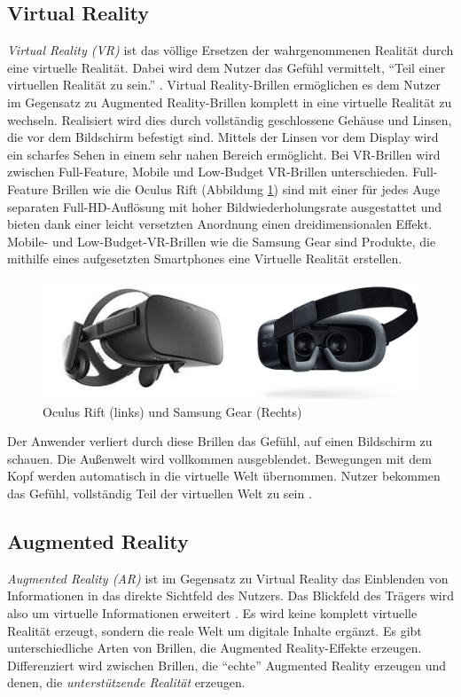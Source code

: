 \subsection{Virtual Reality}
%
\emph{Virtual Reality (VR)} ist das völlige Ersetzen der wahrgenommenen Realität durch eine virtuelle Realität. Dabei wird dem Nutzer das Gefühl vermittelt, \enquote{Teil einer virtuellen Realität zu sein.} \cite[S.~22]{ThomasDirkMetzgerHelmutNiegemannHrsg2018}. Virtual Reality-Brillen ermöglichen es dem Nutzer im Gegensatz zu Augmented Reality-Brillen komplett in eine virtuelle Realität zu wechseln. Realisiert wird dies durch vollständig geschlossene Gehäuse und Linsen, die vor dem Bildschirm befestigt sind. Mittels der Linsen vor dem Display wird ein scharfes Sehen in einem sehr nahen Bereich ermöglicht. Bei VR-Brillen wird zwischen Full-Feature, Mobile und Low-Budget VR-Brillen unterschieden. Full-Feature Brillen wie die Oculus Rift (Abbildung \ref{fig:OculusRift}) sind mit einer für jedes Auge separaten Full-HD-Auflösung mit hoher Bildwiederholungsrate ausgestattet und bieten dank einer leicht versetzten Anordnung einen dreidimensionalen Effekt. Mobile- und Low-Budget-VR-Brillen wie die Samsung Gear sind Produkte, die mithilfe eines aufgesetzten Smartphones eine Virtuelle Realität erstellen.
%
\begin{figure}[htbp]
    \centering
    \includegraphics[width=1\textwidth]{data/bilder/Rift_Gear.pdf}
    \caption{Oculus Rift \cite{Oculus2018} (links) und Samsung Gear \cite{Samsung2018} (Rechts)}
    \label{fig:OculusRift}
\end{figure}
%

Der Anwender verliert durch diese Brillen das Gefühl, auf einen Bildschirm zu schauen. Die Außenwelt wird vollkommen ausgeblendet. Bewegungen mit dem Kopf werden automatisch in die virtuelle Welt übernommen. Nutzer bekommen das Gefühl, vollständig Teil der virtuellen Welt zu sein \cite[S.~22ff]{ThomasDirkMetzgerHelmutNiegemannHrsg2018}. 
%
\subsection{Augmented Reality}
%
\emph{Augmented Reality (AR)} ist im Gegensatz zu Virtual Reality das Einblenden von Informationen in das direkte Sichtfeld des Nutzers. Das Blickfeld des Trägers wird also um virtuelle Informationen erweitert \cite[S.~26]{Schwenke2016}. Es wird keine komplett virtuelle Realität erzeugt, sondern die reale Welt um digitale Inhalte ergänzt. Es gibt  unterschiedliche Arten von Brillen, die Augmented Reality-Effekte erzeugen. Differenziert wird zwischen Brillen, die \enquote{echte} Augmented Reality erzeugen und denen, die \emph{unterstützende Realität} erzeugen.

